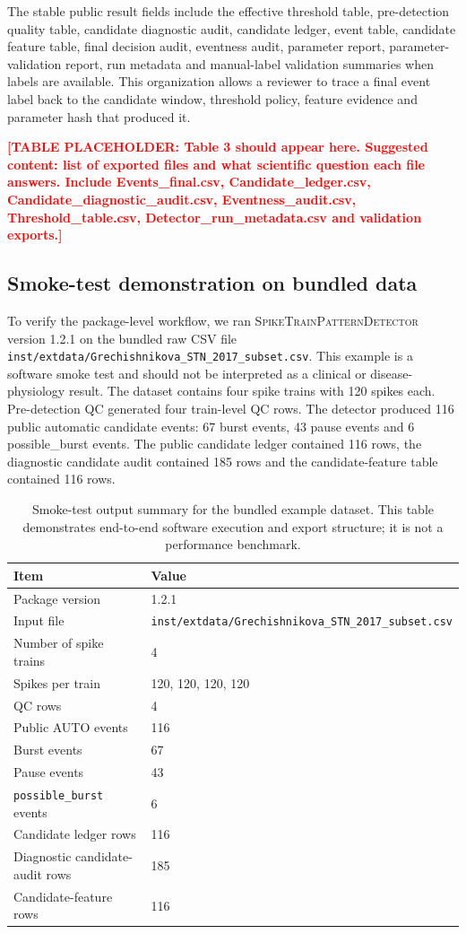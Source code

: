 \documentclass[pdflatex,sn-apa]{sn-jnl}
\newcommand{\stpd}{\textsc{SpikeTrainPatternDetector}}
\newcommand{\TODOTAB}[1]{\par\medskip\noindent\textbf{\textcolor{red}{[TABLE PLACEHOLDER: #1]}}\par\medskip}
\begin{document}
The stable public result fields include the effective threshold table, pre-detection quality table, candidate diagnostic audit, candidate ledger, event table, candidate feature table, final decision audit, eventness audit, parameter report, parameter-validation report, run metadata and manual-label validation summaries when labels are available. This organization allows a reviewer to trace a final event label back to the candidate window, threshold policy, feature evidence and parameter hash that produced it.

\TODOTAB{Table 3 should appear here. Suggested content: list of exported files and what scientific question each file answers. Include Events\_final.csv, Candidate\_ledger.csv, Candidate\_diagnostic\_audit.csv, Eventness\_audit.csv, Threshold\_table.csv, Detector\_run\_metadata.csv and validation exports.}

\subsection{Smoke-test demonstration on bundled data}

To verify the package-level workflow, we ran \stpd{} version 1.2.1 on the bundled raw CSV file \texttt{inst/extdata/Grechishnikova\_STN\_2017\_subset.csv}. This example is a software smoke test and should not be interpreted as a clinical or disease-physiology result. The dataset contains four spike trains with 120 spikes each. Pre-detection QC generated four train-level QC rows. The detector produced 116 public automatic candidate events: 67 burst events, 43 pause events and 6 possible\_burst events. The public candidate ledger contained 116 rows, the diagnostic candidate audit contained 185 rows and the candidate-feature table contained 116 rows.

\begin{table}[t]
\caption{Smoke-test output summary for the bundled example dataset. This table demonstrates end-to-end software execution and export structure; it is not a performance benchmark.}
\label{tab:smoketest}
\centering
\begin{tabular}{ll}
\toprule
Item & Value \\
\midrule
Package version & 1.2.1 \\
Input file & \texttt{inst/extdata/Grechishnikova\_STN\_2017\_subset.csv} \\
Number of spike trains & 4 \\
Spikes per train & 120, 120, 120, 120 \\
QC rows & 4 \\
Public AUTO events & 116 \\
Burst events & 67 \\
Pause events & 43 \\
\texttt{possible\_burst} events & 6 \\
Candidate ledger rows & 116 \\
Diagnostic candidate-audit rows & 185 \\
Candidate-feature rows & 116 \\
\bottomrule
\end{tabular}
\end{table}
\end{document}
